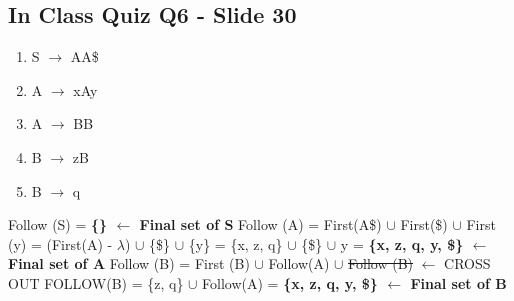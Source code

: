 \documentclass{report}
\begin{document}
\subsection{In Class Quiz Q6 - Slide 30}
\vspace{-1em}
\begin{multicols}{2}
  \begin{enumerate}
    \setlength\itemsep{-.25em}
    \item S $\rightarrow$ AA\$
    \item A $\rightarrow$ xAy
    \item A $\rightarrow$ BB
    \item B $\rightarrow$ zB
    \item B $\rightarrow$ q\newline\newline\newline
  \end{enumerate}
  \setlength{\leftskip}{-12em}
Follow (S) = \textbf{ \{\} $\leftarrow$ Final set of S}\newline
Follow (A) = First(A\$) $\cup$ First(\$) $\cup$ First (y)\newline
\indent\hspace{1.25cm}= (First(A) - $\lambda$) $\cup$ \{\$\} $\cup$ \{y\}\newline
\indent\hspace{1.25cm}= \{x, z, q\} $\cup$ \{\$\} $\cup$ {y}\newline
\indent\hspace{1.25cm}= \textbf{ \{x, z, q, y, \$\} $\leftarrow$ Final set of A}\newline
Follow (B) = First (B) $\cup$ Follow(A) $\cup$ \st{Follow (B)} $\leftarrow$ CROSS OUT FOLLOW(B)\newline
\indent\hspace{1.25cm}= \{z, q\} $\cup$ Follow(A)\newline
\indent\hspace{1.25cm}= \textbf{ \{x, z, q, y, \$\} $\leftarrow$ Final set of B}
\end{multicols}
\vspace{-1em}
\end{document}
